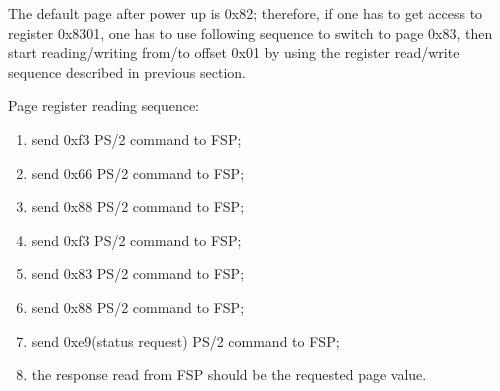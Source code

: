 \documentclass[a4paper,8pt,english]{sphinxmanual}
\begin{document}
The default page after power up is 0x82; therefore, if one has to get
access to register 0x8301, one has to use following sequence to switch
to page 0x83, then start reading/writing from/to offset 0x01 by using
the register read/write sequence described in previous section.

Page register reading sequence:
\begin{enumerate}
\item {} 
send 0xf3 PS/2 command to FSP;

\item {} 
send 0x66 PS/2 command to FSP;

\item {} 
send 0x88 PS/2 command to FSP;

\item {} 
send 0xf3 PS/2 command to FSP;

\item {} 
send 0x83 PS/2 command to FSP;

\item {} 
send 0x88 PS/2 command to FSP;

\item {} 
send 0xe9(status request) PS/2 command to FSP;

\item {} 
the response read from FSP should be the requested page value.

\end{enumerate}
\end{document}
